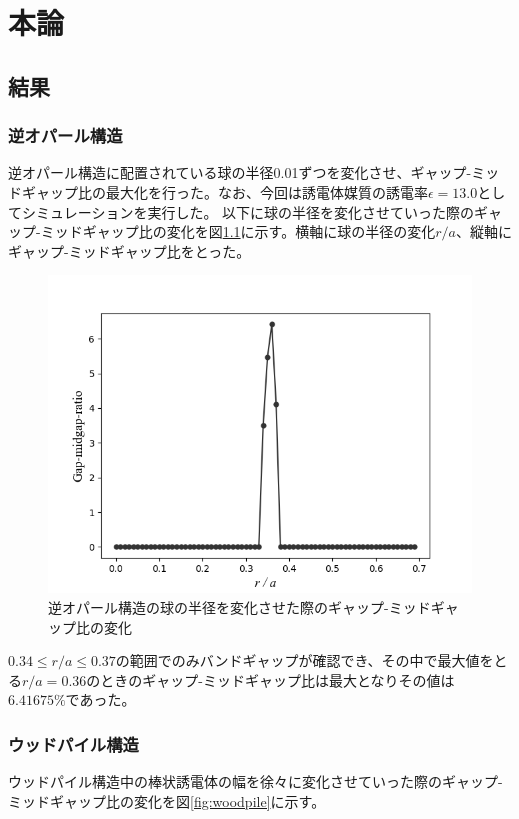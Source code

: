 \documentclass[platex,dvipdfmx]{jsreport}
\numberwithin{equation}{section}
\begin{document}
\chapter{本論}


\section{結果}
\subsection{逆オパール構造}
逆オパール構造に配置されている球の半径0.01ずつを変化させ、ギャップ-ミッドギャップ比の最大化を行った。なお、今回は誘電体媒質の誘電率$\epsilon = 13.0$としてシミュレーションを実行した。
以下に球の半径を変化させていった際のギャップ-ミッドギャップ比の変化を図\ref{fig:inv_opal}に示す。横軸に球の半径の変化$r / a$、縦軸にギャップ-ミッドギャップ比をとった。

\begin{figure}[htbp]
  \centering
  \includegraphics[width=0.8\linewidth]{results/inv_opals.png}
  \caption{逆オパール構造の球の半径を変化させた際のギャップ-ミッドギャップ比の変化}
  \label{fig:inv_opal}
\end{figure}

$0.34 \leq r / a \leq 0.37$の範囲でのみバンドギャップが確認でき、その中で最大値をとる$r / a = 0.36$のときのギャップ-ミッドギャップ比は最大となりその値は$6.41675 \% $であった。



\subsection{ウッドパイル構造}
ウッドパイル構造中の棒状誘電体の幅を徐々に変化させていった際のギャップ-ミッドギャップ比の変化を図\ref{fig:woodpile}に示す。
\end{document}
